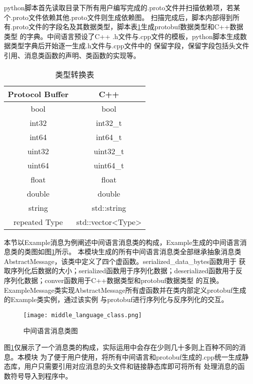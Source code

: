 python脚本首先读取目录下所有用户编写完成的.proto文件并扫描依赖项，若某个.proto文件依赖其他.proto文件则生成依赖图。
扫描完成后，脚本内部得到所有.proto文件的字段名及其数据类型，脚本表\ref{type_convert}生成protobuf数据类型和C++数据类型
的字典。中间语言预设了C++ .h文件与.cpp文件的模板，python脚本生成数据类型字典后开始逐一生成.h文件与.cpp文件中的
保留字段，保留字段包括头文件引用、消息类函数的声明、类函数的实现等。
\begin{table}[htb]
  \centering\small
  \caption{类型转换表}
  \label{type_convert}
  \begin{tabular}{cc}
    \toprule
    Protocol Buffer & C++ \\
    \midrule
    bool & bool \\
    int32 & int32\_t \\
    int64 & int64\_t \\
    uint32 & uint32\_t \\ 
    uint64 & uint64\_t \\
    float & float \\
    double & double \\
    string & std::string \\
    repeated Type & std::vector<Type>\\
    \bottomrule
  \end{tabular}
\end{table}

本节以Example消息为例阐述中间语言消息类的构成，Example生成的中间语言消息类的类图如图\ref{middle_language_class}所示。
本模块生成的所有中间语言消息类全部继承抽象消息类AbstractMessage，该类中定义了四个虚函数。serialized\_data\_bytes函数用于
获取序列化后数据的大小；serialized函数用于序列化数据；deserialized函数用于反序列化数据；conver函数用于C++数据类型和protobuf数据类型
的互换。ExampleMessage类实现AbstractMessage所有虚函数并在类内部定义protobuf生成的Example类实例，通过该实例
与protobuf进行序列化与反序列化的交互。
\begin{figure}[H]
  \centering
  \texttt{[image: middle\_language\_class.png]}
  \caption{中间语言消息类图}
  \label{middle_language_class}
\end{figure}
图\ref{middle_language_class}仅展示了一个消息类的构成，实际运用中会存在少则几十多则上百种不同的消息。本模块
为了便于用户使用，将所有中间语言和protobuf生成的.cpp统一生成静态库，用户只需要引用对应消息的头文件和链接静态库即可将所有
处理消息的函数符号导入到程序中。













